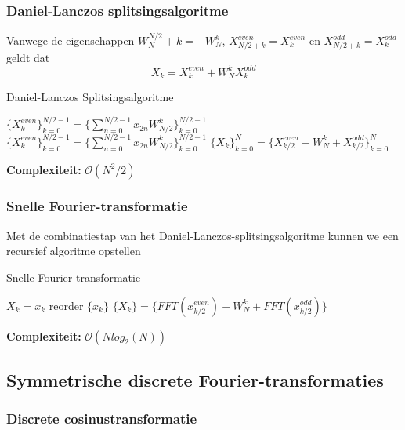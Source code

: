 \documentclass{article}
\begin{document}
	\subsubsection{Daniel-Lanczos splitsingsalgoritme}
	
	Vanwege de eigenschappen $W_N^{N/2}+k = -W_N^k$, $X_{N/2+k}^{even} = X_k^{even}$ en $X_{N/2+k}^{odd} = X_k^{odd}$ geldt dat
	$$
		X_k = X_k^{even} + W_N^k X_k^{odd}
	$$
	
	\begin{algorithm}[!ht]
		\caption{Daniel-Lanczos Splitsingsalgoritme}
		\begin{algorithmic}[1]
				\State $\{X_k^{even}\}_{k=0}^{N/2-1} = \{\sum_{n=0}^{N/2-1} x_{2n}W_{N/2}^k\}_{k=0}^{N/2-1}$
				\State $\{X_k^{even}\}_{k=0}^{N/2-1} = \{\sum_{n=0}^{N/2-1} x_{2n}W_{N/2}^k\}_{k=0}^{N/2-1}$
				\State $\{X_k\}_{k=0}^N = \{X_{k/2}^{even} + W_N^k + X_{k/2}^{odd}\}_{k=0}^N$
			\EndProcedure
		\end{algorithmic}
	\end{algorithm}

	\textbf{Complexiteit:} $\mathcal{O}(N^2/2)$

	\subsubsection{Snelle Fourier-transformatie}
	
	Met de combinatiestap van het Daniel-Lanczos-splitsingsalgoritme kunnen we een recursief algoritme opstellen
	
	\begin{algorithm}[!ht]
		\caption{Snelle Fourier-transformatie}
		\begin{algorithmic}[1]
				\State $X_k=x_k$ 
			\Else
				\State reorder $\{x_k\}$
				\State $\{X_k\} = \{FFT(x_{k/2}^{even}) + W_N^k + FFT(x_{k/2}^{odd})\}$
			\EndIf
			\EndProcedure
		\end{algorithmic}
	\end{algorithm}

	\textbf{Complexiteit:} $\mathcal{O}(Nlog_2(N))$
	
	\subsection{Symmetrische discrete Fourier-transformaties}
	
	\subsubsection{Discrete cosinustransformatie}
	
\end{document}
